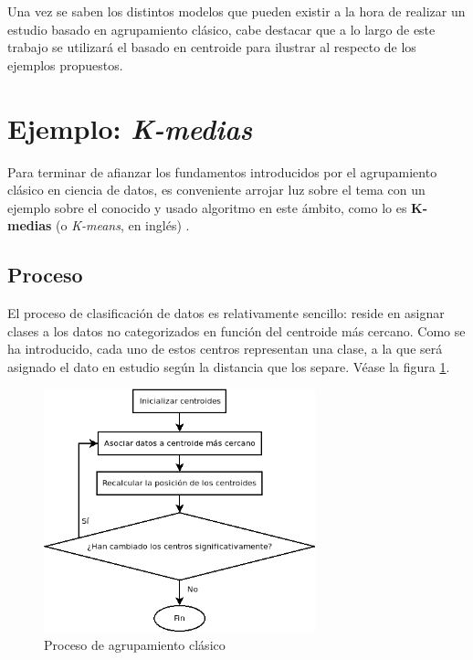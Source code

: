 \documentclass[]{report}
\begin{document}
			Una vez se saben los distintos modelos que pueden existir a la hora de realizar un estudio basado en agrupamiento clásico, cabe destacar que a lo largo de este trabajo se utilizará el basado en centroide para ilustrar al respecto de los ejemplos propuestos.
		
		\section{Ejemplo: \textit{K-medias}}
		
			Para terminar de afianzar los fundamentos introducidos por el agrupamiento clásico en ciencia de datos, es conveniente arrojar luz sobre el tema con un ejemplo sobre el conocido y usado algoritmo en este ámbito, como lo es \textbf{K-medias} (o \textit{K-means}, en inglés) \cite{k-means}.
		
			\subsection{Proceso}
		
				El proceso de clasificación de datos es relativamente sencillo: reside en asignar clases a los datos no categorizados en función del centroide más cercano. Como se ha introducido, cada uno de estos centros representan una clase, a la que será asignado el dato en estudio según la distancia que los separe. Véase la figura \ref{clustering-algorithm}.
			
				\begin{figure}[h!]
					\centering
					\includegraphics[width=0.7\textwidth]{agrupamiento-clasico.png}
					\caption{Proceso de agrupamiento clásico}
					\label{clustering-algorithm}
				\end{figure}
			
\end{document}

